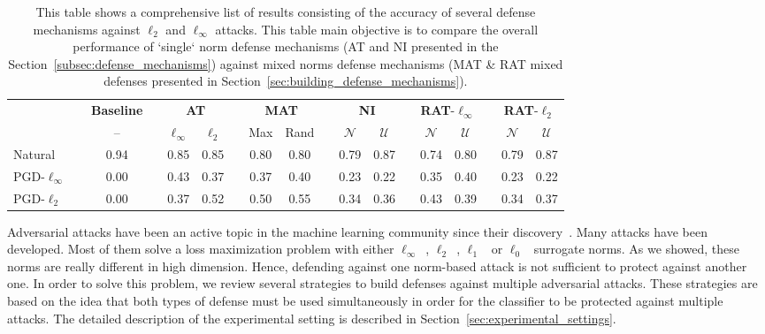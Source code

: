 \begin{table}[htbp]
  \centering
  \caption{This table shows a comprehensive list of results consisting of the accuracy of several defense mechanisms against $\ell_2$ and $\ell_\infty$ attacks. This table main objective is to compare the overall performance of ‘single‘ norm defense mechanisms (AT and NI presented in the Section~\ref{subsec:defense_mechanisms}) against mixed norms defense mechanisms (MAT \& RAT mixed defenses presented in Section~\ref{sec:building_defense_mechanisms}).}
    \begin{tabular}{lccccccccccccccccc}
    \toprule
      &   & \textbf{Baseline} & \phantom{...}  & \multicolumn{2}{c}{\textbf{AT}} & \phantom{...}  & \multicolumn{2}{c}{\textbf{MAT}} &  \phantom{...} & \multicolumn{2}{c}{\textbf{NI}} &  \phantom{...} & \multicolumn{2}{c}{\textbf{RAT}-$\ell_\infty$} &  \phantom{...} & \multicolumn{2}{c}{\textbf{RAT}-$\ell_2$} \\
\cmidrule{3-3}\cmidrule{5-6}\cmidrule{8-9}\cmidrule{11-12}\cmidrule{14-15}\cmidrule{17-18}      &   & -- &   & $\ell_\infty$ & $\ell_2$ &   & Max & Rand &   & $\mathcal{N}$ & $\mathcal{U}$ &   & $\mathcal{N}$ & $\mathcal{U}$ &   & $\mathcal{N}$ & $\mathcal{U}$ \\
    \midrule
    Natural &   & 0.94 &   & 0.85 & 0.85 &   & 0.80 & 0.80 &   & 0.79 & 0.87 &   & 0.74 & 0.80 &   & 0.79 & 0.87 \\
    PGD-$\ell_\infty$ &   & 0.00 &   & 0.43 & 0.37 &   & 0.37 & 0.40 &   & 0.23 & 0.22 &   & 0.35 & 0.40 &   & 0.23 & 0.22 \\
    PGD-$\ell_2$ &   & 0.00 &   & 0.37 & 0.52 &   & 0.50 & 0.55 &   & 0.34 & 0.36 &   & 0.43 & 0.39 &   & 0.34 & 0.37 \\
    \bottomrule
    \end{tabular}%
  \label{tab:results}
\end{table}%

Adversarial attacks have been an active topic in the machine learning community since their discovery~\cite{globerson2006nightmare, biggio2013evasion,Szegedy2013IntriguingPO}. Many attacks have been developed. Most of them solve a loss maximization problem with either $\ell_\infty$~\cite{goodfellow2014explaining,kurakin2016adversarial,madry2018towards}, $\ell_2$~\cite{carlini2017towards,kurakin2016adversarial,madry2018towards}, $\ell_1$~\cite{tramer2019adversarial} or $\ell_0$~\cite{papernot} surrogate norms. As we showed, these norms are really different in high dimension. Hence, defending against one norm-based attack is not sufficient to protect against another one. 
In order to solve this problem, we review several strategies to build defenses against multiple adversarial attacks. These strategies are based on the idea that both types of defense must be used simultaneously in order for the classifier to be protected against multiple attacks. The detailed description of the experimental setting is described in Section~\ref{sec:experimental_settings}. 



